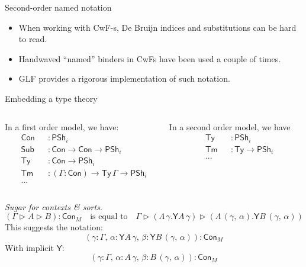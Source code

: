 \documentclass[dvipsnames,aspectratio=169]{beamer}
\newcommand{\Con}{\mathsf{Con}}
\newcommand{\Sub}{\mathsf{Sub}}
\newcommand{\Tm}{\mathsf{Tm}}
\newcommand{\Ty}{\mathsf{Ty}}
\newcommand{\Y}{\mathsf{Y}}
\newcommand{\PSh}{\mathsf{PSh}}
\newcommand{\ext}{\triangleright}
\begin{document}
\begin{frame}{Second-order named notation}
  \begin{itemize}
  \item When working with CwF-s, De Bruijn indices and substitutions
        can be hard to read.
  \item Handwaved ``named'' binders in CwFs have been used a couple of times.
  \item GLF provides a rigorous implementation of such notation.
  \end{itemize}
\end{frame}

\begin{frame}{Embedding a type theory}

\begin{columns}
\begin{column}{0.5\textwidth}
In a first order model, we have:
\begin{alignat*}{3}
  &\Con &&: \PSh_i \\
  &\Sub &&: \Con \to \Con \to \PSh_i \\
  &\Ty  &&: \Con \to \PSh_i \\
  &\Tm  &&: (\Gamma : \Con) \to \Ty\,\Gamma \to \PSh_i \\
  & ... &&
\end{alignat*}
\end{column}
\begin{column}{0.5\textwidth}
In a second order model, we have
\begin{alignat*}{3}
  &\Ty  &&: \PSh_i \\
  &\Tm  &&: \Ty \to \PSh_i \\
  & ... && \\
  & && \\
  & &&
\end{alignat*}
\end{column}
\end{columns}
\vspace{0.5em}
\pause

\emph{Sugar for contexts \& sorts}.
\[(\Gamma \ext A \ext B) : \Con_M \quad \text{is equal to}\quad  \Gamma \ext (\Lambda\,\gamma. \Y A\,\gamma) \ext (\Lambda\,(\gamma,\,\alpha). \Y B\,(\gamma,\,\alpha)) \]
\pause
This suggests the notation:
\[(\gamma : \Gamma,\,\alpha : \Y A\,\gamma,\,\beta : \Y B\,(\gamma,\,\alpha)) : \Con_M\]
With implicit $\Y$:
\[(\gamma : \Gamma,\,\alpha : A\,\gamma,\,\beta : B\,(\gamma,\,\alpha)) : \Con_M\]

\end{frame}
\end{document}
